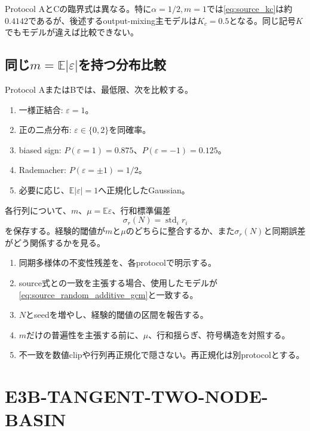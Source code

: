 \documentclass[a4paper,11pt,oneside,openany]{ltjsbook}
\newcommand{\E}{\mathbb{E}}
\begin{document}
Protocol AとCの臨界式は異なる。特に\(\alpha=1/2,m=1\)では\cref{eq:source_kc}は約\(0.4142\)であるが、後述するoutput-mixing主モデルは\(K_c=0.5\)となる。同じ記号\(K\)でもモデルが違えば比較できない。

\subsection{同じ\(m=\E|\varepsilon|\)を持つ分布比較}

Protocol AまたはBでは、最低限、次を比較する。

\begin{enumerate}
  \item 一様正結合: \(\varepsilon=1\)。
  \item 正の二点分布: \(\varepsilon\in\{0,2\}\)を同確率。
  \item biased sign: \(P(\varepsilon=1)=0.875\)、\(P(\varepsilon=-1)=0.125\)。
  \item Rademacher: \(P(\varepsilon=\pm1)=1/2\)。
  \item 必要に応じ、\(\E|\varepsilon|=1\)へ正規化したGaussian。
\end{enumerate}

各行列について、\(m\)、\(\mu=\E\varepsilon\)、行和標準偏差
\begin{equation}
  \sigma_r(N)
  =\operatorname{std}_i r_i
  \label{eq:row_sum_std}
\end{equation}
を保存する。経験的閾値が\(m\)と\(\mu\)のどちらに整合するか、また\(\sigma_r(N)\)と同期誤差がどう関係するかを見る。

\begin{gatebox}
\begin{enumerate}
  \item 同期多様体の不変性残差を、各protocolで明示する。
  \item source式との一致を主張する場合、使用したモデルが\cref{eq:source_random_additive_gcm}と一致する。
  \item \(N\)とseedを増やし、経験的閾値の区間を報告する。
  \item \(m\)だけの普遍性を主張する前に、\(\mu\)、行和揺らぎ、符号構造を対照する。
  \item 不一致を数値clipや行列再正規化で隠さない。再正規化は別protocolとする。
\end{enumerate}
\end{gatebox}

\section{E3B-TANGENT-TWO-NODE-BASIN}
\end{document}
